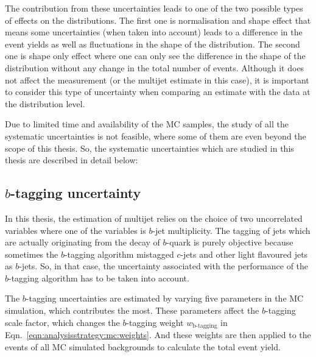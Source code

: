 The contribution from these uncertainties leads to one of the two possible types of effects on the distributions. The first one is normalisation and shape effect that means some uncertainties (when taken into account) leads to a difference in the event yields as well as fluctuations in the shape of the distribution. The second one is shape only effect where one can only see the difference in the shape of the distribution without any change in the total number of events. Although it does not affect the measurement (or the multijet estimate in this case), it is important to consider this type of uncertainty when comparing an estimate with the data at the distribution level.

Due to limited time and availability of the MC samples, the study of all the systematic uncertainties is not feasible, where some of them are even beyond the scope of this thesis.  So, the systematic uncertainties which are studied in this thesis are described in detail below:

\subsection{$b$-tagging uncertainty}
\label{sec:uncertainties:systematics:btagging}
In this thesis, the estimation of multijet relies on the choice of two uncorrelated variables where one of the variables is $b$-jet multiplicity. The tagging of jets which are actually originating from the decay of $b$-quark is purely objective because sometimes the $b$-tagging algorithm mistagged $c$-jets and other light flavoured jets as $b$-jets.  So, in that case, the uncertainty associated with the performance of the $b$-tagging algorithm has to be taken into account.

The $b$-tagging uncertainties are estimated by varying five parameters in the MC simulation, which contributes the most. These parameters affect the $b$-tagging scale factor, which changes the $b$-tagging weight $w_{\text{b-tagging}}$ in Eqn.\ \ref{eqn:analysisstrategy:mc:weights}. And these weights are then applied to the events of all MC simulated backgrounds to calculate the total event yield.

